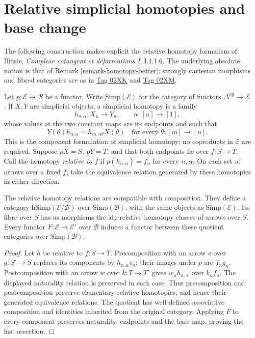 
\section{Relative simplicial homotopies and base change}
\label{section-illusie-I-relative-homotopy}

\noindent
The following construction makes explicit the relative homotopy formalism
of Illusie, \textit{Complexe cotangent et d\'eformations I}, I.1.1.6.
The underlying absolute notion is that of
Remark \ref{remark-homotopy-better}; strongly cartesian morphisms and fibred
categories are as in
\href{https://stacks.math.columbia.edu/tag/02XK}{Tag 02XK} and
\href{https://stacks.math.columbia.edu/tag/02XM}{Tag 02XM}.

Let $p:\mathcal E\to\mathcal B$ be a functor. Write
$\mathrm{Simp}(\mathcal E)$ for the category of functors
$\Delta^{\mathrm{op}}\to\mathcal E$. If $X,Y$ are simplicial objects,
a simplicial homotopy is a family
$$
h_{n,\alpha}:X_n\longrightarrow Y_n,
\qquad \alpha:[n]\longrightarrow[1],
$$
whose values at the two constant maps are its endpoints and such that
$$
Y(\theta)h_{n,\alpha}
=h_{m,\alpha\theta}X(\theta)
\quad\text{for every }\theta:[m]\longrightarrow[n].
$$
This is the component formulation of simplicial homotopy; no coproducts
in $\mathcal E$ are required. Suppose $pX=S$, $pY=T$, and that both endpoints
lie over $f:S\to T$. Call the homotopy \emph{relative to $f$} if
$p(h_{n,\alpha})=f_n$ for every $n,\alpha$.
On each set of arrows over a fixed $f$, take the equivalence relation
generated by these homotopies in either direction.

\begin{lemma}
\label{lemma-illusie-I-relative-homotopy-quotient}
The relative homotopy relations are compatible with composition. They define
a category $\mathrm{hSimp}(\mathcal E/\mathcal B)$ over
$\mathrm{Simp}(\mathcal B)$, with the same objects as
$\mathrm{Simp}(\mathcal E)$. Its fibre over $S$ has as morphisms the
$\mathrm{id}_S$-relative homotopy classes of arrows over $S$.
Every functor $F:\mathcal E\to\mathcal E'$ over $\mathcal B$ induces a
functor between these quotient categories over $\mathrm{Simp}(\mathcal B)$.
\end{lemma}

\begin{proof}
Let $h$ be relative to $f:S\to T$. Precomposition with an arrow $v$
over $g:S'\to S$ replaces its components by $h_{n,\alpha}v_n$;
their images under $p$ are $f_ng_n$. Postcomposition with an arrow $w$
over $k:T\to T'$ gives $w_nh_{n,\alpha}$ over $k_nf_n$.
The displayed naturality relation is preserved in each case. Thus
precomposition and postcomposition preserve elementary relative homotopies,
and hence their generated equivalence relations. The quotient has
well-defined associative composition and identities inherited from the
original category. Applying $F$ to every component preserves naturality,
endpoints and the base map, proving the last assertion.
\end{proof}


